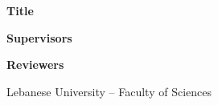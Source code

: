 \begin{titlepage}
\vspace{0.9cm}
{\large\bfseries Title\par}
\vspace{0.4cm}
{\Large\itshape \reporttitle\par}

\vspace{0.9cm}
{\large\bfseries Supervisors\par}
\vspace{0.2cm}
{\large \reportsupervisor\par}
\vspace{0.12cm}
{\large \reportsupervisortwo\par}

\vspace{0.6cm}
{\large\bfseries Reviewers\par}
\vspace{0.2cm}
{\large \reviewerone\par}
\vspace{0.12cm}
{\large \reviewertwo\par}

\vfill
{\large Lebanese University -- Faculty of Sciences\par}

\end{titlepage}
